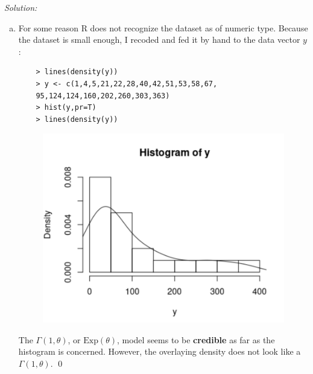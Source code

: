 \documentclass{book}
\theoremstyle{definition}
\begin{document}
\noindent \textit{Solution:}  
\begin{enumerate}[(a)]
	\item For some reason R does not recognize the dataset as of numeric type. Because the dataset is small enough, I recoded and fed it by hand to the data vector $y$:
	\begin{lstlisting}
	> lines(density(y))
	> y <- c(1,4,5,21,22,28,40,42,51,53,58,67,
	95,124,124,160,202,260,303,363)
	> hist(y,pr=T)
	> lines(density(y))
	\end{lstlisting}
	\begin{figure}[!htb]
		\centering
		\includegraphics[scale=0.3]{411a}
	\end{figure}
	The $\Gamma(1,\theta)$, or $\text{Exp}(\theta)$, model seems to be \textbf{credible} as far as the histogram is concerned. However, the overlaying density does not look like a $\Gamma(1,\theta)$. \qed
	
	
	

\end{enumerate}
\end{document}
